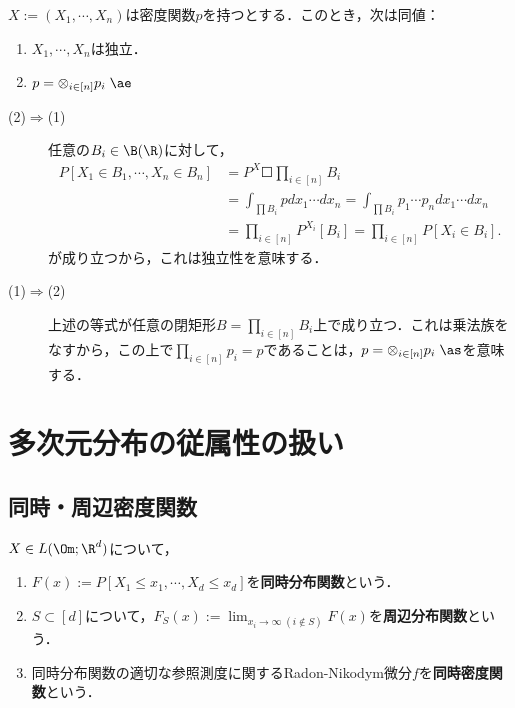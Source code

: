 \documentclass[uplatex,dvipdfmx]{jsreport}
\begin{document}
\begin{proposition}
    $X:=(X_1,\cdots,X_n)$は密度関数$p$を持つとする．このとき，次は同値：
    \begin{enumerate}
        \item $X_1,\cdots,X_n$は独立．
        \item $p=\otimes_{i\in[n]}p_i\;\ae$
    \end{enumerate}
\end{proposition}
\begin{Proof}\mbox{}
    \begin{description}
        \item[(2)$\Rightarrow$(1)] 
        任意の$B_i\in\B(\R)$に対して，
        \begin{align*}
            P[X_1\in B_1,\cdots,X_n\in B_n]&=P^X\Square{\prod_{i\in[n]}B_i}\\
            &=\int_{\prod B_i}pdx_1\cdots dx_n=\int_{\prod B_i}p_1\cdots p_ndx_1\cdots dx_n\\
            &=\prod_{i\in[n]}P^{X_i}[B_i]=\prod_{i\in[n]}P[X_i\in B_i].
        \end{align*}
        が成り立つから，これは独立性を意味する．
        \item[(1)$\Rightarrow$(2)] 上述の等式が任意の閉矩形$B=\prod_{i\in[n]}B_i$上で成り立つ．これは乗法族をなすから，この上で$\prod_{i\in[n]}p_i=p$であることは，$p=\otimes_{i\in[n]}p_i\;\as$を意味する．
    \end{description}
\end{Proof}

\section{多次元分布の従属性の扱い}

\subsection{同時・周辺密度関数}

\begin{definition}
    $X\in L(\Om;\R^d)$について，
    \begin{enumerate}
        \item $F(x):=P[X_1\le x_1,\cdots,X_d\le x_d]$を\textbf{同時分布関数}という．
        \item $S\subset[d]$について，$F_S(x):=\lim_{x_i\to\infty\;(i\notin S)}F(x)$を\textbf{周辺分布関数}という．
        \item 同時分布関数の適切な参照測度に関するRadon-Nikodym微分$f$を\textbf{同時密度関数}という．
    \end{enumerate}
\end{definition}
\end{document}
